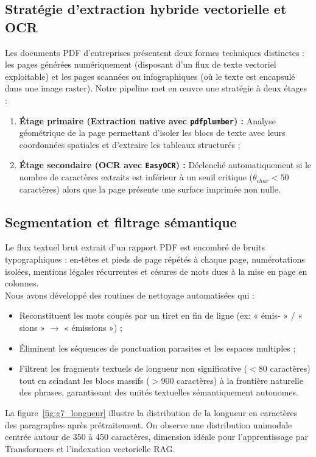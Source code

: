\documentclass[12pt,a4paper]{report}
\begin{document}
\subsection{Stratégie d'extraction hybride vectorielle et OCR}
Les documents PDF d'entreprises présentent deux formes techniques distinctes : les pages générées numériquement (disposant d'un flux de texte vectoriel exploitable) et les pages scannées ou infographiques (où le texte est encapsulé dans une image raster). Notre pipeline met en œuvre une stratégie à deux étages :
\begin{enumerate}
    \item \textbf{Étage primaire (Extraction native avec \texttt{pdfplumber}) :} Analyse géométrique de la page permettant d'isoler les blocs de texte avec leurs coordonnées spatiales et d'extraire les tableaux structurés ;
    \item \textbf{Étage secondaire (OCR avec \texttt{EasyOCR}) :} Déclenché automatiquement si le nombre de caractères extraits est inférieur à un seuil critique ($\theta_{char} < 50$ caractères) alors que la page présente une surface imprimée non nulle.
\end{enumerate}

\subsection{Segmentation et filtrage sémantique}
Le flux textuel brut extrait d'un rapport PDF est encombré de bruits typographiques : en-têtes et pieds de page répétés à chaque page, numérotations isolées, mentions légales récurrentes et césures de mots dues à la mise en page en colonnes.\\

Nous avons développé des routines de nettoyage automatisées qui :
\begin{itemize}
    \item Reconstituent les mots coupés par un tiret en fin de ligne (ex: « émis- » / « sions » $\rightarrow$ « émissions ») ;
    \item Éliminent les séquences de ponctuation parasites et les espaces multiples ;
    \item Filtrent les fragments textuels de longueur non significative ($< 80$ caractères) tout en scindant les blocs massifs ($> 900$ caractères) à la frontière naturelle des phrases, garantissant des unités textuelles sémantiquement autonomes.
\end{itemize}

La figure~\ref{fig:g7_longueur} illustre la distribution de la longueur en caractères des paragraphes après prétraitement. On observe une distribution unimodale centrée autour de 350 à 450 caractères, dimension idéale pour l'apprentissage par Transformers et l'indexation vectorielle RAG.
\end{document}
